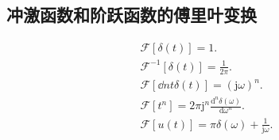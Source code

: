 \subsection{冲激函数和阶跃函数的傅里叶变换} \label{3 冲激函数和阶跃函数的傅里叶变换}
\rmg
\begin{gather}
    \mathcal{F}[\delta(t)]=1. \\
    \mathcal{F}^{-1}[\delta(t)]=\frac{1}{2\pi}. \label{eq:3.5 F-1 delta} \\
    \mathcal{F}\left[\dd{n}{t}\delta(t)\right]=(\mathrm{j}\omega)^n. \\
    \mathcal{F}[t^n]=2\pi\mathrm{j}^n\frac{\mathrm{d}^n\delta(\omega)}{\mathrm{d}\omega^n}. \\
    \mathcal{F}[u(t)]=\pi\delta(\omega)+\frac{1}{\mathrm{j}\omega}.
\end{gather}
